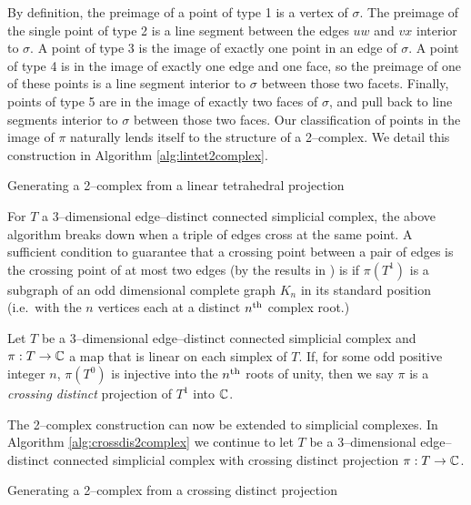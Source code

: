 By definition, the preimage of a point of type 1 is a vertex of $\sigma$.
The preimage of the single point of type 2 is a line segment between the edges $uw$ and $vx$ interior to $\sigma$.
A point of type 3 is the image of exactly one point in an edge of $\sigma$.
A point of type 4 is in the image of exactly one edge and one face, so the preimage of one of these points is a line segment interior to $\sigma$ between those two facets.
Finally, points of type 5 are in the image of exactly two faces of $\sigma$, and pull back to line segments interior to $\sigma$ between those two faces.
Our classification of points in the image of $\pi$ naturally lends itself to the structure of a 2--complex.
We detail this construction in Algorithm \ref{alg:lintet2complex}.

\begin{algorithm}
	\caption{Generating a 2--complex from a linear tetrahedral projection}
	\label{alg:lintet2complex}
\end{algorithm}

For $T$ a 3--dimensional edge--distinct connected simplicial complex, the above algorithm breaks down when a triple of edges cross at the same point.
A sufficient condition to guarantee that a crossing point between a pair of edges is the crossing point of at most two edges (by the results in \cite{PoonRub98}) is if $\pi(T^1)$ is a subgraph of an odd dimensional complete graph $K_n$ in its standard position (i.e.\ with the $n$ vertices each at a distinct $n^{\text{th}}$ complex root.)

\begin{defn}
	Let $T$ be a 3--dimensional edge--distinct connected simplicial complex and $\pi:T\to\mathbb{C}$ a map that is linear on each simplex of $T$.
	If, for some odd positive integer $n$, $\pi(T^0)$ is injective into the $n^{\text{th}}$ roots of unity, then we say $\pi$ is a \emph{crossing distinct} projection of $T^1$ into $\mathbb{C}$.
\end{defn}

The 2--complex construction can now be extended to simplicial complexes.
In Algorithm \ref{alg:crossdis2complex} we continue to let $T$ be a 3--dimensional edge--distinct connected simplicial complex with crossing distinct projection $\pi:T\to\mathbb{C}$.

\begin{algorithm}
	\caption{Generating a 2--complex from a crossing distinct projection}
	\label{alg:crossdis2complex}
\end{algorithm}